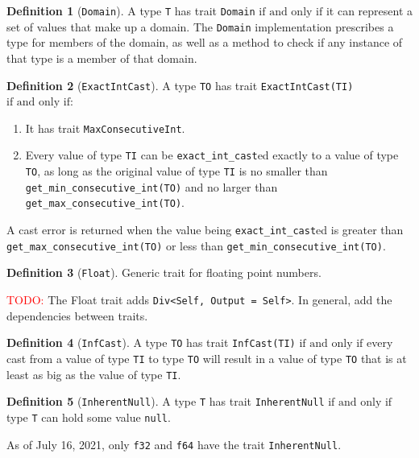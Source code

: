 \documentclass[11pt,a4paper]{article}
\theoremstyle{definition}
\newtheorem{definition}{Definition}[section]
\newcommand{\todo}{{\textcolor{red}{TODO: }}}
\newcommand{\iffText}{\text{if and only if}}
\begin{document}
\begin{definition}[\texttt{Domain}]
A type \texttt{T} has trait \texttt{Domain} $\iffText$ it can represent a set of values that make up a domain. The \texttt{Domain} implementation prescribes a type for members of the domain, as well as a method to check if any instance of that type is a member of that domain.
\end{definition}

\begin{definition}[\texttt{ExactIntCast}]
    A type \texttt{TO} has trait \texttt{ExactIntCast(TI)} $\iffText$:
    \begin{enumerate}
    \item It has trait \texttt{MaxConsecutiveInt}.
    \item Every value of type \texttt{TI} can be \texttt{exact\_int\_cast}ed exactly to a value of type \texttt{TO}, as long as the original value of type \texttt{TI} is no smaller than \texttt{get\_min\_consecutive\_int(TO)} and no larger than \texttt{get\_max\_consecutive\_int(TO)}.
    \end{enumerate}
    
    A cast error is returned when the value being \texttt{exact\_int\_cast}ed is greater than \texttt{get\_max\_consecutive\_int(TO)} or less than \texttt{get\_min\_consecutive\_int(TO)}.
\end{definition}

\begin{definition}[\texttt{Float}]
    Generic trait for floating point numbers. 
\end{definition}

\todo{The Float trait adds \texttt{Div<Self, Output = Self>}}. In general, add the dependencies between traits.

\begin{definition}[\texttt{InfCast}]
A type \texttt{TO} has trait \texttt{InfCast(TI)} $\iffText$ every cast from a value of type \texttt{TI} to type \texttt{TO} will result in a value of type \texttt{TO} that is at least as big as the value of type \texttt{TI}.
\end{definition}

\begin{definition}[\texttt{InherentNull}]
A type \texttt{T} has trait \texttt{InherentNull} $\iffText$ type \texttt{T} can hold some value \texttt{null}.

As of July 16, 2021, only \texttt{f32} and \texttt{f64} have the trait \texttt{InherentNull}.
\end{definition}
\end{document}
